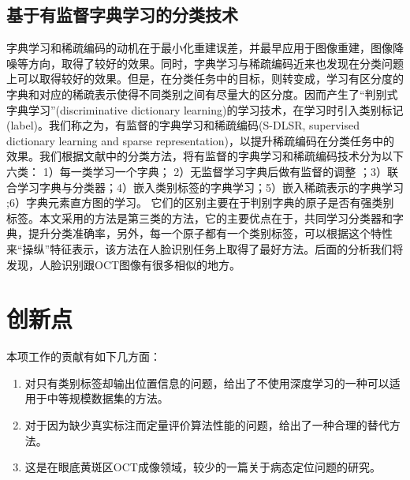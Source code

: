     \subsection{基于有监督字典学习的分类技术}
    字典学习和稀疏编码的动机在于最小化重建误差，并最早应用于图像重建，图像降噪等方向，取得了较好的效果。同时，字典学习与稀疏编码近来也发现在分类问题上可以取得较好的效果。但是，在分类任务中的目标，则转变成，学习有区分度的字典和对应的稀疏表示使得不同类别之间有尽量大的区分度。因而产生了“判别式字典学习”(discriminative dictionary learning)的学习技术，在学习时引入类别标记(label)。我们称之为，有监督的字典学习和稀疏编码(S-DLSR, supervised dictionary learning and sparse representation)，以提升稀疏编码在分类任务中的效果。我们根据文献中的分类方法，将有监督的字典学习和稀疏编码技术分为以下六类： 1）每一类学习一个字典\cite{wright2009robust,yang2010metaface}； 2）无监督学习字典后做有监督的调整\cite{fulkerson2008localizing} ；3）联合学习字典与分类器\cite{mairal2008discriminative,jiang2013label,zhang2010discriminative,pham2008joint,yang2008unifying}；4）嵌入类别标签的字典学习\cite{yang2011fisher,rodriguez2008sparse}；5）嵌入稀疏表示的字典学习 \cite{gangeh2013kernelized,zhang2013simultaneous,lazebnik2009supervised};6）字典元素直方图的学习。\cite{lian2010probabilistic,zhang2009learning}
    它们的区别主要在于判别字典的原子是否有强类别标签。本文采用的方法是第三类\cite{jiang2013label}的方法，它的主要优点在于，共同学习分类器和字典，提升分类准确率，另外，每一个原子都有一个类别标签，可以根据这个特性来“操纵”特征表示，该方法在人脸识别任务上取得了最好方法。后面的分析我们将发现，人脸识别跟OCT图像有很多相似的地方。

\section{创新点}
    本项工作的贡献有如下几方面：
    \begin{enumerate}
        \item 对只有类别标签却输出位置信息的问题，给出了不使用深度学习的一种可以适用于中等规模数据集的方法。
        \item 对于因为缺少真实标注而定量评价算法性能的问题，给出了一种合理的替代方法。
        \item 这是在眼底黄斑区OCT成像领域，较少的一篇关于病态定位问题的研究。
    \end{enumerate}
